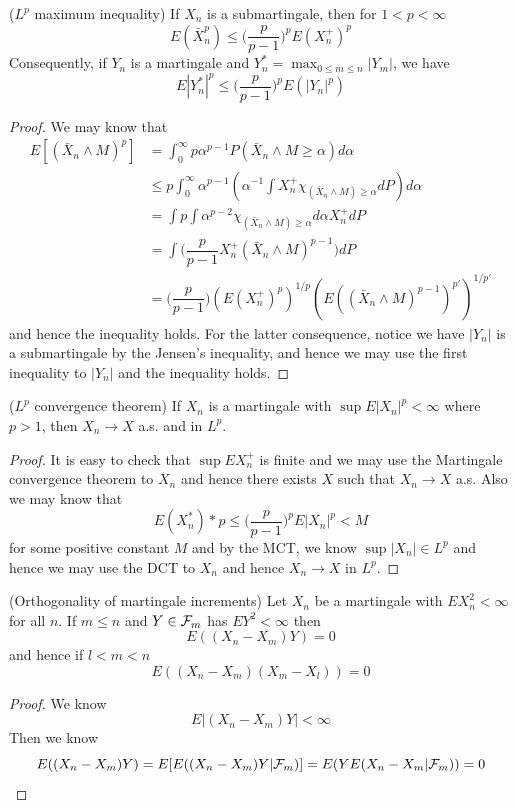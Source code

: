 \begin{theorem}
    ($L^p$ maximum inequality) If $X_n$ is a submartingale, then for $1< p < \infty$
    \[E(\bar{X}_n^p) \leq \Big(\dfrac{p}{p-1}\Big)^p E(X_n^+)^p\]
    Consequently, if $Y_n$ is a martingale and $Y_n^* = \max_{0\leq m \leq n} |Y_m|$, we have
    \[E|Y_n^*|^p \leq \Big(\dfrac{p}{p-1}\Big)^p E(|Y_n|^p)\]
\end{theorem}
\begin{proof}
    We may know that
    \[
    \begin{aligned}
    E[(\bar{X}_n\wedge M)^p] &= \int_0^{\infty} p\alpha^{p-1}P(\bar{X}_n\wedge M \geq \alpha)d\alpha     \\
    &\leq p\int_0^{\infty} \alpha^{p-1}(\alpha^{-1}\int X_n^+\chi_{(\bar{X}_n\wedge M)\geq \alpha}dP)d\alpha \\
    & = \int p\int\alpha^{p-2}\chi_{(\bar{X}_n\wedge M) \geq \alpha} d\alpha X_n^+ dP \\
    & = \int\Big(\dfrac{p}{p-1}X_n^+(\bar{X}_n\wedge M)^{p-1}\Big)dP \\
    &= \Big(\dfrac{p}{p-1}\Big)(E(X_n^+)^p)^{1/p}(E((\bar{X}_n\wedge M)^{p-1})^{p'})^{1/p'}
    \end{aligned}
    \]
    and hence the inequality holds. For the latter consequence, notice we have $|Y_n|$ is a submartingale by the Jensen's inequality, and hence we may use the first inequality to $|Y_n|$ and the inequality holds.
\end{proof}

\begin{theorem}
    ($L^p$ convergence theorem) If $X_n$ is a martingale with $\sup E|X_n|^p < \infty$ where $p > 1$, then $X_n \to X$ a.s. and in $L^p$.
\end{theorem}
\begin{proof}
    It is easy to check that $\sup EX_n^+$ is finite and we may use the Martingale convergence theorem to $X_n$ and hence there exists $X$ such  that $X_n \to X$ a.s. Also we may know that
    \[E(X_n^*)*p \leq \Big(\dfrac{p}{p-1}\Big)^p E|X_n|^p < M\]
    for some positive constant $M$ and by the MCT, we know $\sup |X_n| \in L^p$ and hence we may use the DCT to $X_n$ and hence $X_n \to X$ in $L^p$.
\end{proof}

\begin{theorem}
    (Orthogonality of martingale increments) Let $X_n$ be a martingale with $EX_n^2 < \infty$ for all $n$. If $m\leq n$ and $Y\in\mathcal{F}_m$ has $EY^2 < \infty$ then
    \[E((X_n-X_m)Y) = 0\]
    and hence if $l<m<n$
    \[E((X_n-X_m)(X_m-X_l)) = 0\] 
\end{theorem}
\begin{proof}
    We know
    \[E|(X_n-X_m)Y| < \infty\]
    Then we know
    \[
    E((X_n-X_m)Y) = E[E((X_n-X_m)Y|\mathcal{F}_m)] = E(YE(X_n-X_m|\mathcal{F}_m)) = 0
    \]
\end{proof}

